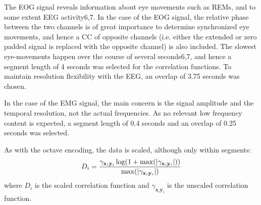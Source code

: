 The EOG signal reveals information about eye movements such as REMs, and to some extent EEG activity6,7. In the case of the EOG signal, the relative phase between the two channels is of great importance to determine synchronized eye movements, and hence a CC of opposite channels (i.e. either the extended or zero padded signal is replaced with the opposite channel) is also included. The slowest eye-movements happen over the course of several seconds6,7, and hence a segment length of 4 seconds was selected for the correlation functions. To maintain resolution flexibility with the EEG, an overlap of 3.75 seconds was chosen.

In the case of the EMG signal, the main concern is the signal amplitude and the temporal resolution, not the actual frequencies. As no relevant low frequency content is expected, a segment length of 0.4 seconds and an overlap of 0.25 seconds was selected.

As with the octave encoding, the data is scaled, although only within segments:
\begin{equation}
    D_i = \frac{ \gamma_{\mathbf{x}_i \mathbf{y}_i} \log \! \left( 1 + \max \! \left( \left|\gamma_{\mathbf{x}_i \mathbf{y}_i}\right| \right) \right)}{\max \! \left( \left|\gamma_{\mathbf{x}_i \mathbf{y}_i}\right| \right)}
\end{equation}
where $D_i$ is the scaled correlation function and $\gamma_{\mathbf{x}_i \mathbf{y}_i}$ is the unscaled correlation function.

